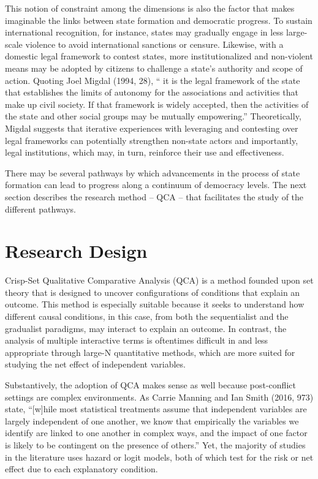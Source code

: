 \documentclass [11pt]{article}
\begin{document}
This notion of constraint among the dimensions is also the factor that makes imaginable the links between state formation and democratic progress. To sustain international recognition, for instance, states may gradually engage in less large-scale violence to avoid international sanctions or censure. Likewise, with a domestic legal framework to contest states, more institutionalized and non-violent means may be adopted by citizens to challenge a state's authority and scope of action. Quoting Joel Migdal (1994, 28), `` it is the legal framework of the state that establishes the limits of autonomy for the associations and activities that make up civil society. If that framework is widely accepted, then the activities of the state and other social groups may be mutually empowering.'' Theoretically, Migdal suggests that iterative experiences with leveraging and contesting over legal frameworks can potentially strengthen non-state actors and importantly, legal institutions, which may, in turn, reinforce their use and effectiveness.

There may be several pathways by which advancements in the process of state formation can lead to progress along a continuum of democracy levels. The next section describes the research method -- QCA -- that facilitates the study of the different pathways.

\section*{Research Design}

Crisp-Set Qualitative Comparative Analysis (QCA) is a method founded upon set theory that is designed to uncover configurations of conditions that explain an outcome. This method is especially suitable because it seeks to understand how different causal conditions, in this case, from both the sequentialist and the gradualist paradigms, may interact to explain an outcome. In contrast, the analysis of multiple interactive terms is oftentimes difficult in and less appropriate through large-N quantitative methods, which are more suited for studying the net effect of independent variables.

Substantively, the adoption of QCA makes sense as well because post-conflict settings are complex environments. As Carrie Manning and Ian Smith (2016, 973) state, ``[w]hile most statistical treatments assume that independent variables are largely independent of one another, we know that empirically the variables we identify are linked to one another in complex ways, and the impact of one factor is likely to be contingent on the presence of others.'' Yet, the majority of studies in the literature uses hazard or logit models, both of which test for the risk or net effect due to each explanatory condition.
\end{document}
